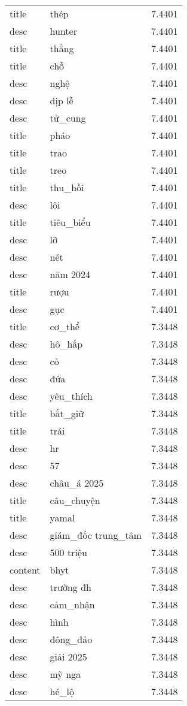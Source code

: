 \documentclass{article}
\begin{document}
\begin{tabular}{lll}
title & thép & 7.4401\\
desc & hunter & 7.4401\\
title & thẳng & 7.4401\\
title & chỗ & 7.4401\\
desc & nghệ & 7.4401\\
desc & dịp lễ & 7.4401\\
desc & tử\_cung & 7.4401\\
title & pháo & 7.4401\\
title & trao & 7.4401\\
title & treo & 7.4401\\
title & thu\_hồi & 7.4401\\
desc & lôi & 7.4401\\
title & tiêu\_biểu & 7.4401\\
desc & lỡ & 7.4401\\
desc & nét & 7.4401\\
desc & năm 2024 & 7.4401\\
title & rượu & 7.4401\\
desc & gục & 7.4401\\
title & cơ\_thể & 7.3448\\
desc & hô\_hấp & 7.3448\\
desc & cỏ & 7.3448\\
desc & đứa & 7.3448\\
desc & yêu\_thích & 7.3448\\
title & bắt\_giữ & 7.3448\\
title & trái & 7.3448\\
desc & hr & 7.3448\\
desc & 57 & 7.3448\\
desc & châu\_á 2025 & 7.3448\\
title & câu\_chuyện & 7.3448\\
title & yamal & 7.3448\\
desc & giám\_đốc trung\_tâm & 7.3448\\
desc & 500 triệu & 7.3448\\
content & bhyt & 7.3448\\
desc & trường đh & 7.3448\\
desc & cảm\_nhận & 7.3448\\
desc & hình & 7.3448\\
desc & đông\_đảo & 7.3448\\
desc & giải 2025 & 7.3448\\
desc & mỹ nga & 7.3448\\
desc & hé\_lộ & 7.3448\\

\end{tabular}
\end{document}
